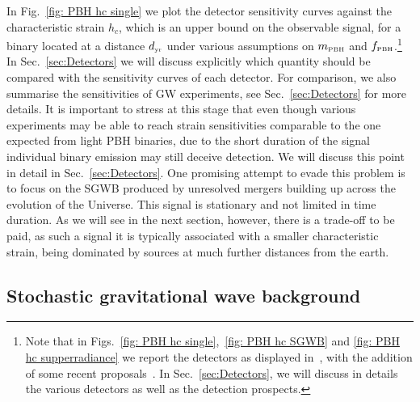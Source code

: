 \documentclass[11pt,a4paper]{article}
\newcommand{\PBH}{\text{\tiny PBH}}
\begin{document}
In Fig.~\ref{fig: PBH hc single} we plot the detector sensitivity curves against the characteristic strain $h_c$, which is an upper bound on the observable signal,
for a binary located at a distance $d_\text{\tiny yr}$ under various assumptions on $m_\PBH$ and $f_\PBH$.\footnote{Note that in Figs.~\ref{fig: PBH hc single},~\ref{fig: PBH hc SGWB} and \ref{fig: PBH hc supperradiance} we report the detectors as displayed in~\cite{Aggarwal:2020olq}, with the addition of some recent proposals~\cite{Berlin:2021txa, Domcke:2022rgu, Berlin:2022hfx}. In Sec.~\ref{sec:Detectors}, we will discuss in details the various detectors as well as the detection prospects.} 
In Sec.~\ref{sec:Detectors} we will discuss explicitly which quantity should be compared with the sensitivity curves of each detector.
For comparison, we also summarise the sensitivities of GW experiments, see Sec.~\ref{sec:Detectors} for more details. 
It is important to stress at this stage that even though various experiments may be able to reach strain sensitivities comparable to the one expected from light PBH binaries, due to the short duration of the signal individual binary emission may still deceive detection.
We will discuss this point in detail in Sec.~\ref{sec:Detectors}.
One promising attempt to evade this problem is to focus on the SGWB produced by unresolved mergers building up across the evolution of the Universe. 
This signal is stationary and not limited in time duration. 
As we will see in the next section, however, there is a trade-off to be paid,  as such a signal it is typically associated with a smaller characteristic strain, being dominated by sources at much further distances from the earth.  


\subsection{Stochastic gravitational wave background}
\label{sec:SGWB}
\end{document}
